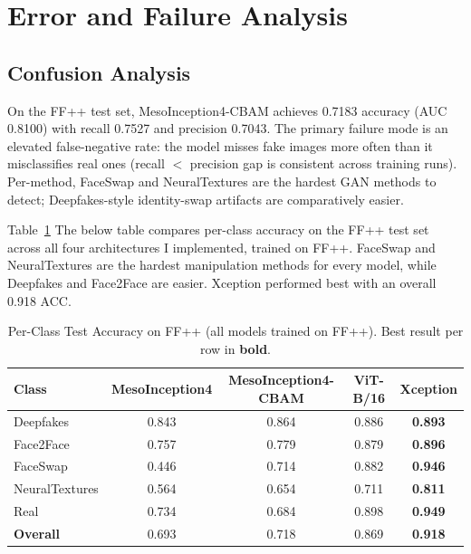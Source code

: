 \documentclass[conference]{IEEEtran}
\begin{document}
\section{Error and Failure Analysis}
\label{sec:error}

\subsection{Confusion Analysis}
On the FF++ test set, MesoInception4-CBAM achieves 0.7183 accuracy (AUC 0.8100) with recall 0.7527 and precision 0.7043.  The primary failure mode is an elevated
false-negative rate: the model misses fake images more often than it misclassifies real ones (recall $<$ precision gap is consistent across training runs). Per-method, FaceSwap and NeuralTextures are the hardest GAN
methods to detect; Deepfakes-style identity-swap artifacts are comparatively easier.

Table~\ref{tab:permethod_ff} The below table compares per-class accuracy on the FF++ test set
across all four architectures I implemented, trained on FF++.
FaceSwap and NeuralTextures are the hardest manipulation methods for every
model, while Deepfakes and Face2Face are easier. Xception performed best with an overall 0.918 ACC.

\begin{table}[t]
\centering
\caption{Per-Class Test Accuracy on FF++ (all models trained on FF++).
            Best result per row in \textbf{bold}.}
\label{tab:permethod_ff}
\begin{tabular}{lcccc}
\toprule
\textbf{Class} & \textbf{MesoInception4} & \textbf{MesoInception4-CBAM} & \textbf{ViT-B/16} & \textbf{Xception} \\
\midrule
Deepfakes       & 0.843 & 0.864 & 0.886 & \textbf{0.893} \\
Face2Face       & 0.757 & 0.779 & 0.879 & \textbf{0.896} \\
FaceSwap        & 0.446 & 0.714 & 0.882 & \textbf{0.946} \\
NeuralTextures  & 0.564 & 0.654 & 0.711 & \textbf{0.811} \\
Real            & 0.734 & 0.684 & 0.898 & \textbf{0.949} \\
\midrule
\textbf{Overall} & 0.693 & 0.718 & 0.869 & \textbf{0.918} \\
\bottomrule
\end{tabular}
\end{table}
\end{document}
